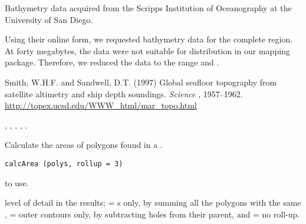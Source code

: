 \documentclass[letterpaper]{book}
\begin{document}
%
\begin{Source}\relax
Bathymetry data acquired from the Scripps Institution of Oceanography
at the University of San Diego.

Using their online form, we requested bathymetry data for the complete
 region.  At forty megabytes, the data were not
suitable for distribution in our mapping package.  Therefore, we
reduced the data to the range  and .
\end{Source}
%
\begin{References}\relax
Smith, W.H.F. and Sandwell, D.T. (1997) Global seafloor topography from
satellite altimetry and ship depth soundings. \emph{Science} ,
1957--1962. \\{}
\url{http://topex.ucsd.edu/WWW_html/mar_topo.html}
\end{References}
%
\begin{SeeAlso}\relax
{},
,
,
,
.
\end{SeeAlso}
%
\begin{Description}\relax
Calculate the areas of polygons found in a .
\end{Description}
%
\begin{Usage}
\begin{verbatim}
calcArea (polys, rollup = 3)
\end{verbatim}
\end{Usage}
%
\begin{Arguments}
\begin{ldescription}
\item[\code{polys}]  to use.
\item[\code{rollup}] level of detail in the results;  = s
only, by summing all the polygons with the same ,  =
outer contours only, by subtracting holes from their parent, and
 = no roll-up.
\end{ldescription}
\end{Arguments}
%
\end{document}
